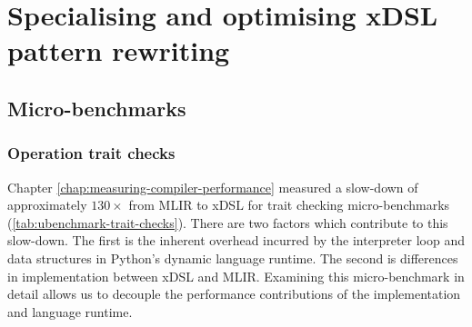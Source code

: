 \chapter{Specialising and optimising xDSL pattern rewriting}

\section{Micro-benchmarks}


\subsection{Operation trait checks}

Chapter \ref{chap:measuring-compiler-performance} measured a slow-down of approximately $130\times$ from MLIR to xDSL for trait checking micro-benchmarks (\autoref{tab:ubenchmark-trait-checks}).
There are two factors which contribute to this slow-down. The first is the inherent overhead incurred by the interpreter loop and data structures in Python's dynamic language runtime. The second is differences in implementation between xDSL and MLIR.
Examining this micro-benchmark in detail allows us to decouple the performance contributions of the implementation and language runtime.

